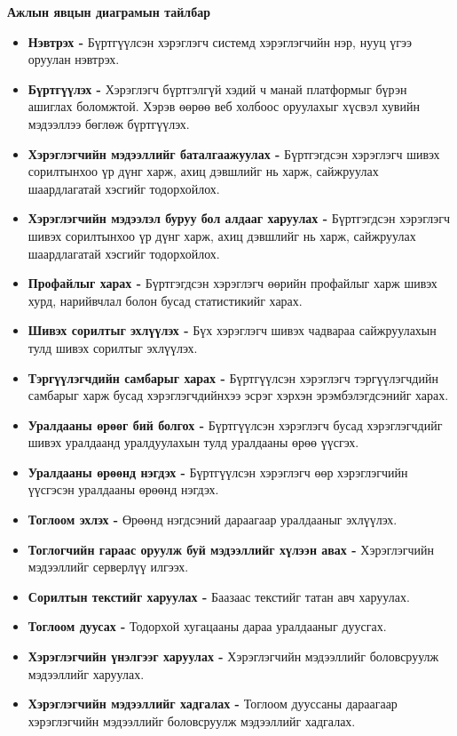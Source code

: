 \textbf{Ажлын явцын диаграмын тайлбар}

\begin{itemize}
	\item \textbf{Нэвтрэх -} Бүртгүүлсэн хэрэглэгч системд хэрэглэгчийн нэр, нууц үгээ оруулан нэвтрэх.
	\item \textbf{Бүртгүүлэх -} Хэрэглэгч бүртгэлгүй хэдий ч манай платформыг бүрэн ашиглах боломжтой. Хэрэв өөрөө веб холбоос оруулахыг хүсвэл хувийн мэдээллээ бөглөж бүртгүүлэх.
	\item \textbf{Хэрэглэгчийн мэдээллийг баталгаажуулах -} Бүртгэгдсэн хэрэглэгч шивэх сорилтынхоо үр дүнг харж, ахиц дэвшлийг нь харж, сайжруулах шаардлагатай хэсгийг тодорхойлох.
	\item \textbf{Хэрэглэгчийн мэдээлэл буруу бол алдааг харуулах -} Бүртгэгдсэн хэрэглэгч шивэх сорилтынхоо үр дүнг харж, ахиц дэвшлийг нь харж, сайжруулах шаардлагатай хэсгийг тодорхойлох.
	\item \textbf{Профайлыг харах -} Бүртгэгдсэн хэрэглэгч өөрийн профайлыг харж шивэх хурд, нарийвчлал болон бусад статистикийг харах.
	\item \textbf{Шивэх сорилтыг эхлүүлэх -} Бүх хэрэглэгч шивэх чадвараа сайжруулахын тулд шивэх сорилтыг эхлүүлэх.
	\item \textbf{Тэргүүлэгчдийн самбарыг харах -} Бүртгүүлсэн хэрэглэгч тэргүүлэгчдийн самбарыг харж бусад хэрэглэгчдийнхээ эсрэг хэрхэн эрэмбэлэгдсэнийг харах.
	\item \textbf{Уралдааны өрөөг бий болгох -} Бүртгүүлсэн хэрэглэгч бусад хэрэглэгчдийг шивэх уралдаанд уралдуулахын тулд уралдааны өрөө үүсгэх.
	\item \textbf{Уралдааны өрөөнд нэгдэх -} Бүртгүүлсэн хэрэглэгч өөр хэрэглэгчийн үүсгэсэн уралдааны өрөөнд нэгдэх.
	\item \textbf{Тоглоом эхлэх -} Өрөөнд нэгдсэний дараагаар уралдааныг эхлүүлэх.
	\item \textbf{Тоглогчийн гараас оруулж буй мэдээллийг хүлээн авах -} Хэрэглэгчийн мэдээллийг серверлүү илгээх.
	\item \textbf{Сорилтын текстийг харуулах -} Баазаас текстийг татан авч харуулах.
	\item \textbf{Тоглоом дуусах -} Тодорхой хугацааны дараа уралдааныг дуусгах.
	\item \textbf{Хэрэглэгчийн  үнэлгээг харуулах -} Хэрэглэгчийн мэдээллийг боловсруулж мэдээллийг харуулах.
	\item \textbf{Хэрэглэгчийн мэдээллийг хадгалах -} Тоглоом дууссаны дараагаар хэрэглэгчийн мэдээллийг боловсруулж мэдээллийг хадгалах.
\end{itemize}

